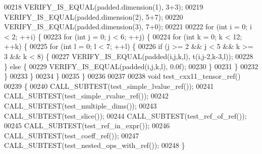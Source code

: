 \begin{DoxyCode}
00218   VERIFY\_IS\_EQUAL(padded.dimension(1), 3+3);
00219   VERIFY\_IS\_EQUAL(padded.dimension(2), 5+7);
00220   VERIFY\_IS\_EQUAL(padded.dimension(3), 7+0);
00221 
00222   \textcolor{keywordflow}{for} (\textcolor{keywordtype}{int} i = 0; i < 2; ++i) \{
00223     \textcolor{keywordflow}{for} (\textcolor{keywordtype}{int} j = 0; j < 6; ++j) \{
00224       \textcolor{keywordflow}{for} (\textcolor{keywordtype}{int} k = 0; k < 12; ++k) \{
00225         \textcolor{keywordflow}{for} (\textcolor{keywordtype}{int} l = 0; l < 7; ++l) \{
00226           \textcolor{keywordflow}{if} (j >= 2 && j < 5 && k >= 3 && k < 8) \{
00227             VERIFY\_IS\_EQUAL(padded(i,j,k,l), t(i,j-2,k-3,l));
00228           \} \textcolor{keywordflow}{else} \{
00229             VERIFY\_IS\_EQUAL(padded(i,j,k,l), 0.0f);
00230           \}
00231         \}
00232       \}
00233     \}
00234   \}
00235 \}
00236 
00237 
00238 \textcolor{keywordtype}{void} test\_cxx11\_tensor\_ref()
00239 \{
00240   CALL\_SUBTEST(test\_simple\_lvalue\_ref());
00241   CALL\_SUBTEST(test\_simple\_rvalue\_ref());
00242   CALL\_SUBTEST(test\_multiple\_dims());
00243   CALL\_SUBTEST(test\_slice());
00244   CALL\_SUBTEST(test\_ref\_of\_ref());
00245   CALL\_SUBTEST(test\_ref\_in\_expr());
00246   CALL\_SUBTEST(test\_coeff\_ref());
00247   CALL\_SUBTEST(test\_nested\_ops\_with\_ref());
00248 \}
\end{DoxyCode}
